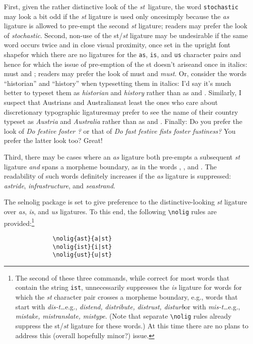 \documentclass[11pt]{article}
\newcommand{\pkg}[1]{\textsf{#1}}
\newcommand{\opt}[1]{\texttt{#1}}
\newcommand{\cmmd}[1]{\texttt{\textbackslash #1}}
\begin{document}
First, given the rather distinctive look of the \emph{st}~ligature, the word \opt{stochastic} may look a bit odd if the \emph{st} ligature is used only once\textemdash\emph{}\textemdash simply because the \emph{as} ligature is allowed to pre-empt the second \emph{st} ligature; readers may prefer the look of \emph{stochastic}. Second, non-use of the st/\emph{st} ligature may be undesirable if the same word occurs twice and in close visual proximity, once set in the upright font shape\textemdash for which there are no ligatures for the \opt{as}, \opt{is}, and \opt{us} character pairs and hence for which the issue of pre-emption of the st doesn't arise\textemdash and once in italics: must and \emph{}; readers may prefer the look of must and \emph{must}. Or, consider the words \enquote{historian} and \enquote{history} when typesetting them in italics: I'd say it's much better to typeset them as \emph{historian} and \emph{history} rather than as \emph{} and \emph{}. Similarly, I suspect that Austrians and Australians\textemdash at least the ones who care about discretionary typographic ligatures\textemdash may prefer to see the name of their country typeset as \emph{Austria} and \emph{Australia} rather than as \emph{} and \emph{}. Finally: Do you prefer the look of \emph{Do  festive  foster ?} or that of \emph{Do fast festive fists foster fustiness?} You prefer the latter look too? Great! 

Third, there may be cases where an \emph{as} ligature both pre-empts a subsequent \emph{st} ligature \emph{and} spans a morpheme boundary, as in the words \emph{}, \emph{}, and \emph{}. The readability of such words definitely increases if the \emph{as} ligature is suppressed: \emph{astride}, \emph{infrastructure}, and \emph{seastrand}.

The \pkg{selnolig} package is set to give preference to the distinctive-looking \emph{st} ligature over \emph{as}, \emph{is}, and \emph{us} ligatures. To this end, the following \cmmd{nolig} rules are provided:\footnote{The second of these three commands, while correct for most words that contain the string \opt{ist}, unnecessarily suppresses the \emph{is} ligature for words for which the \emph{st} character pair crosses a morpheme boundary, e.g., words that start with \emph{dis-t\ldots}\textemdash e.g., \emph{distend, distribute, distrust, disturb}\textemdash or with \emph{mis-t\ldots}\textemdash e.g., \emph{mistake, mistranslate, mistype}. (Note that separate \cmmd{nolig} rules already suppress the st/\emph{st} ligature for these words.) At this time there are no plans to address this (overall hopefully minor?) issue.}
\begin{Verbatim}
              \nolig{ast}{a|st}
              \nolig{ist}{i|st}
              \nolig{ust}{u|st}
\end{Verbatim}
\end{document}
